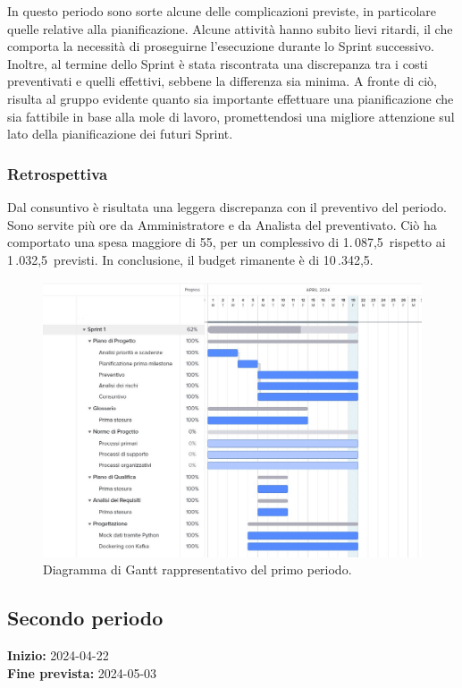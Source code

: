 In questo periodo sono sorte alcune delle complicazioni previste, in particolare quelle relative alla pianificazione. Alcune attività hanno subito lievi ritardi, il che comporta la necessità di proseguirne l'esecuzione durante lo Sprint successivo. Inoltre, al termine dello Sprint è stata riscontrata una discrepanza tra i costi preventivati e quelli effettivi, sebbene la differenza sia minima. A fronte di ciò, risulta al gruppo evidente quanto sia importante effettuare una pianificazione che sia fattibile in base alla mole di lavoro, promettendosi una migliore attenzione sul lato della pianificazione dei futuri Sprint.
\subsubsection{Retrospettiva}
Dal consuntivo è risultata una leggera discrepanza con il preventivo del periodo. Sono servite più ore da Amministratore e da Analista del preventivato.
Ciò ha comportato una spesa maggiore di 55\;\texteuro, per un complessivo di 1.\,087,5\;\texteuro\
rispetto ai 1\,.032,5\;\texteuro\ previsti.
In conclusione, il budget rimanente è di 10\,.342,5\;\texteuro. 
\begin{figure}[h!]
    \centering
    \includegraphics[width=15cm]{./asset/gantt1.jpeg}
    \caption{Diagramma di Gantt rappresentativo del primo periodo.}
    \label{figure:Diagramma di Gantt rappresentativo del primo periodo}
\end{figure}
\clearpage
\newpage
\subsection{Secondo periodo} \label{sec:2_rtb}
\textbf{Inizio:} 2024-04-22\\
\textbf{Fine prevista:} 2024-05-03

